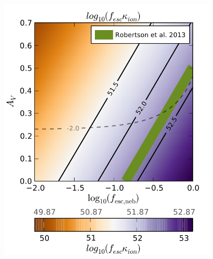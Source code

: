 \begin{landscape}
\begin{figure}
  \includegraphics[width=0.25\paperheight]{plots/Fig6c.pdf}


\end{figure}
\end{landscape}
